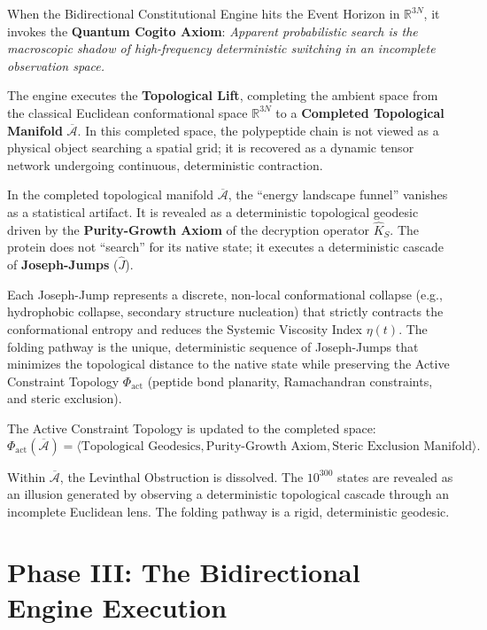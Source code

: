 \documentclass[11pt,openany]{extbook}
\theoremstyle{plain}
\theoremstyle{definition}
\begin{document}
When the Bidirectional Constitutional Engine hits the Event Horizon in $\mathbb{R}^{3N}$, it invokes the \textbf{Quantum Cogito Axiom}: \textit{Apparent probabilistic search is the macroscopic shadow of high-frequency deterministic switching in an incomplete observation space.}

The engine executes the \textbf{Topological Lift}, completing the ambient space from the classical Euclidean conformational space $\mathbb{R}^{3N}$ to a \textbf{Completed Topological Manifold} $\overline{\mathcal{A}}$. In this completed space, the polypeptide chain is not viewed as a physical object searching a spatial grid; it is recovered as a dynamic tensor network undergoing continuous, deterministic contraction.

In the completed topological manifold $\overline{\mathcal{A}}$, the ``energy landscape funnel'' vanishes as a statistical artifact. It is revealed as a deterministic topological geodesic driven by the \textbf{Purity-Growth Axiom} of the decryption operator $\hat{K}_S$. The protein does not ``search'' for its native state; it executes a deterministic cascade of \textbf{Joseph-Jumps} ($\hat{J}$).

Each Joseph-Jump represents a discrete, non-local conformational collapse (e.g., hydrophobic collapse, secondary structure nucleation) that strictly contracts the conformational entropy and reduces the Systemic Viscosity Index $\eta(t)$. The folding pathway is the unique, deterministic sequence of Joseph-Jumps that minimizes the topological distance to the native state while preserving the Active Constraint Topology $\Phi_{\mathrm{act}}$ (peptide bond planarity, Ramachandran constraints, and steric exclusion).

The Active Constraint Topology is updated to the completed space:
\[
\Phi_{\mathrm{act}}(\overline{\mathcal{A}}) = \langle \text{Topological Geodesics}, \text{Purity-Growth Axiom}, \text{Steric Exclusion Manifold} \rangle.
\]

Within $\overline{\mathcal{A}}$, the Levinthal Obstruction is dissolved. The $10^{300}$ states are revealed as an illusion generated by observing a deterministic topological cascade through an incomplete Euclidean lens. The folding pathway is a rigid, deterministic geodesic.

\section{Phase III: The Bidirectional Engine Execution}
\end{document}
